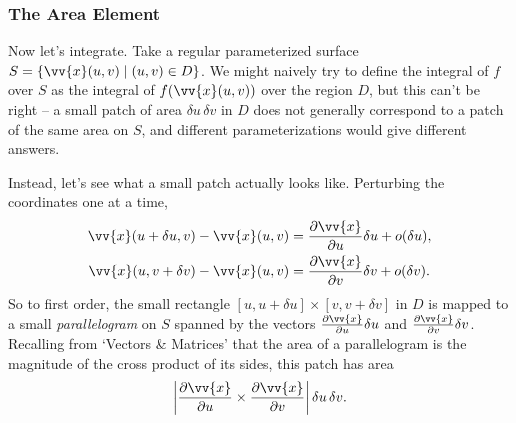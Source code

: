 \subsubsection{The Area Element}

Now let's integrate. Take a regular parameterized surface $S = \{\vv{x}(u, v) \mid (u, v) \in D\}$. We might naively try to define the integral of $f$ over $S$ as the integral of $f(\vv{x}(u, v))$ over the region $D$, but this can't be right -- a small patch of area $\delta u \, \delta v$ in $D$ does not generally correspond to a patch of the same area on $S$, and different parameterizations would give different answers.

Instead, let's see what a small patch actually looks like. Perturbing the coordinates one at a time,
\begin{align*}
	\vv{x}(u + \delta u, v) - \vv{x}(u, v) &= \frac{\partial \vv{x}}{\partial u} \delta u + o(\delta u), \\
	\vv{x}(u, v + \delta v) - \vv{x}(u, v) &= \frac{\partial \vv{x}}{\partial v} \delta v + o(\delta v).
\end{align*}
So to first order, the small rectangle $[u, u + \delta u] \times [v, v + \delta v]$ in $D$ is mapped to a small \emph{parallelogram} on $S$ spanned by the vectors $\frac{\partial \vv{x}}{\partial u} \delta u$ and $\frac{\partial \vv{x}}{\partial v} \delta v$. Recalling from `Vectors \& Matrices' that the area of a parallelogram is the magnitude of the cross product of its sides, this patch has area
$$
\left|\frac{\partial \vv{x}}{\partial u} \times \frac{\partial \vv{x}}{\partial v}\right| \delta u \, \delta v.
$$

\begin{center}
\end{center}

